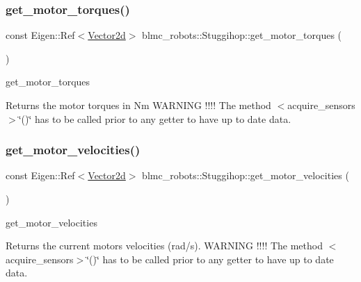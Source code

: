 \subsubsection{\texorpdfstring{get\+\_\+motor\+\_\+torques()}{get\_motor\_torques()}}
{\footnotesize\ttfamily const Eigen\+::\+Ref$<$\hyperlink{common__header_8hpp_acb6916bc8c9fe9d98c484fd4cc201447}{Vector2d}$>$ blmc\+\_\+robots\+::\+Stuggihop\+::get\+\_\+motor\+\_\+torques (\begin{DoxyParamCaption}{ }\end{DoxyParamCaption})\hspace{0.3cm}{\ttfamily [inline]}}



get\+\_\+motor\+\_\+torques 

\begin{DoxyReturn}{Returns}
the motor torques in Nm W\+A\+R\+N\+I\+NG !!!! The method $<$acquire\+\_\+sensors$>$\char`\"{}()\char`\"{} has to be called prior to any getter to have up to date data. 
\end{DoxyReturn}
\mbox{\label{classblmc__robots_1_1Stuggihop_accb7420eaa50dafb84c434623697a272}} 
\subsubsection{\texorpdfstring{get\+\_\+motor\+\_\+velocities()}{get\_motor\_velocities()}}
{\footnotesize\ttfamily const Eigen\+::\+Ref$<$\hyperlink{common__header_8hpp_acb6916bc8c9fe9d98c484fd4cc201447}{Vector2d}$>$ blmc\+\_\+robots\+::\+Stuggihop\+::get\+\_\+motor\+\_\+velocities (\begin{DoxyParamCaption}{ }\end{DoxyParamCaption})\hspace{0.3cm}{\ttfamily [inline]}}



get\+\_\+motor\+\_\+velocities 

\begin{DoxyReturn}{Returns}
the current motors velocities (rad/s). W\+A\+R\+N\+I\+NG !!!! The method $<$acquire\+\_\+sensors$>$\char`\"{}()\char`\"{} has to be called prior to any getter to have up to date data. 
\end{DoxyReturn}
\mbox{\label{classblmc__robots_1_1Stuggihop_a206157411d7bd41d5d599106512482ae}} 
